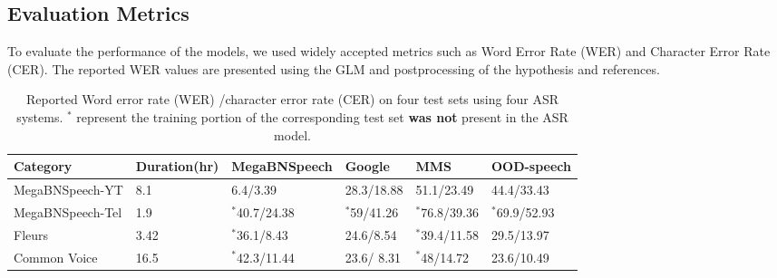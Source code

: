 \subsection{Evaluation Metrics}
To evaluate the performance of the models, we used widely accepted metrics such as Word Error Rate (WER) and Character Error Rate (CER). The reported WER values are presented using the GLM and postprocessing of the hypothesis and references. 

\begin{table*} [!ht]
\centering
\begin{tabular}{llllll}
\hline
\textbf{Category} & \textbf{Duration(hr)}  & \textbf{MegaBNSpeech}  & \textbf{Google}  & \textbf{MMS} & \textbf{OOD-speech}\\
\hline
MegaBNSpeech-YT & 8.1 & 6.4/3.39&	28.3/18.88&	51.1/23.49&	44.4/33.43 \\
MegaBNSpeech-Tel & 1.9 & $^*$40.7/24.38	& $^*$59/41.26&	$^*$76.8/39.36&	$^*$69.9/52.93 \\
Fleurs & 3.42 & $^*$36.1/8.43	&24.6/8.54&	$^*$39.4/11.58&	29.5/13.97 \\
Common Voice & 16.5  & $^*$42.3/11.44 &	23.6/ 8.31&	$^*$48/14.72 & 23.6/10.49 \\
\hline
\end{tabular}
\caption{Reported Word error rate (WER) /character error rate (CER) on four test sets using four ASR systems. $^*$ represent the training portion of the corresponding test set \textbf{was not} present in the ASR model. %
}
\label{overall_evaluation_all_model}
\end{table*}
